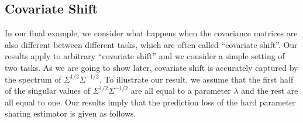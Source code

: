 
\subsection{Covariate Shift} \label{sec_covshift}

In our final example, we consider what happens when the covariance matrices are also different between different tasks, which are often called ``covariate shift''.
Our results apply to arbitrary ``covariate shift'' and we consider a simple setting of two tasks.
As we are going to show later, covariate shift is accurately captured by the spectrum of $\Sigma^{1/2}\Sigma^{-1/2}$.
To illustrate our result, we assume that the first half of the singular values of $\Sigma^{1/2}\Sigma^{-1/2}$ are all equal to a parameter $\lambda$ and the rest are all equal to one.
Our results imply that the prediction loss of the hard parameter sharing estimator is given as follows.

